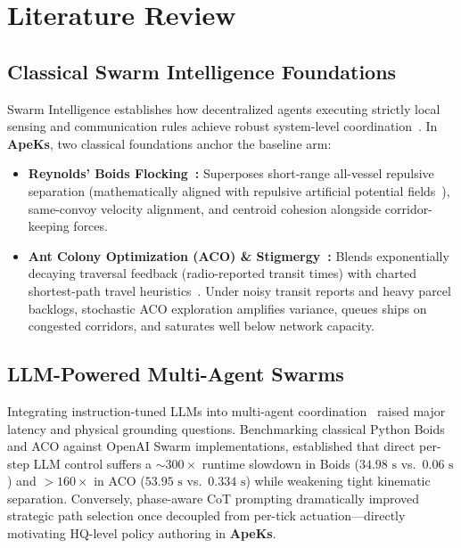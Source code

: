 \documentclass[11pt,a4paper,oneside]{report}
\begin{document}
\chapter[Literature Review]{Literature Review}
\label{cp:literature}

\parindent0pt

\section{Classical Swarm Intelligence Foundations}
Swarm Intelligence establishes how decentralized agents executing strictly local sensing and communication rules achieve robust system-level coordination~\citep{Bonabeau1999,Schranz2021}. In \textbf{ApeKs}, two classical foundations anchor the baseline arm:
\begin{itemize}
    \item \textbf{Reynolds' Boids Flocking~\citep{Reynolds1987}:} Superposes short-range all-vessel repulsive separation (mathematically aligned with repulsive artificial potential fields~\citep{Khatib1986}), same-convoy velocity alignment, and centroid cohesion alongside corridor-keeping forces.
    \item \textbf{Ant Colony Optimization (ACO) \& Stigmergy~\citep{Dorigo2006}:} Blends exponentially decaying traversal feedback (radio-reported transit times) with charted shortest-path travel heuristics~\citep{Hart1968}. Under noisy transit reports and heavy parcel backlogs, stochastic ACO exploration amplifies variance, queues ships on congested corridors, and saturates well below network capacity.
\end{itemize}

\section{LLM-Powered Multi-Agent Swarms}
Integrating instruction-tuned LLMs into multi-agent coordination~\citep{JimenezRomero2025,OpenAISwarm2024} raised major latency and physical grounding questions. Benchmarking classical Python Boids and ACO against OpenAI Swarm implementations, \citet{Rahman2026} established that direct per-step LLM control suffers a $\sim 300\times$ runtime slowdown in Boids ($34.98\text{ s}$ vs.\ $0.06\text{ s}$) and $> 160\times$ in ACO ($53.95\text{ s}$ vs.\ $0.334\text{ s}$) while weakening tight kinematic separation. Conversely, phase-aware CoT prompting dramatically improved strategic path selection once decoupled from per-tick actuation---directly motivating HQ-level policy authoring in \textbf{ApeKs}.
\end{document}
